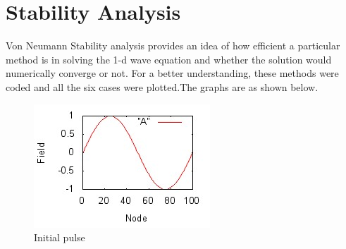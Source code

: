 \documentclass[a4paper,12pt]{report}
\begin{document}
\section{Stability Analysis}
Von Neumann Stability analysis provides an idea of how efficient a particular method is in solving the 1-d wave equation and whether the solution would numerically converge or not. For a better understanding, these methods were coded and all the six cases were plotted.The graphs are as shown below.
\begin{figure} [h]
	\centering
	\includegraphics{Actual.jpeg}  
	\caption{Initial pulse} 
	\label{fig:initial} 
\end{figure} 
\end{document}
